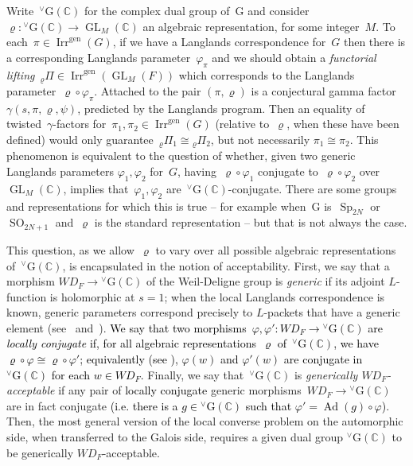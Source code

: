 \documentclass[12pt]{amsart}
\newcommand{\BC}{\mathbb {C}}
\newcommand{\Ad}{\operatorname{Ad}}
\newcommand{\GL}{\operatorname{GL}}
\newcommand{\Irr}{\operatorname{Irr}}
\newcommand{\Irrgen}{\Irr^{\operatorname{gen}}}
\newcommand{\SO}{\operatorname{SO}}
\newcommand{\G}{\mathrm{G}}
\newcommand{\Sp}{\operatorname{Sp}}
\newcommand{\WD}{{WD}}
\def\vG{{}^\vee\G}
\def\shaun#1{\textcolor{black}{#1}}
\begin{document}
Write~$\vG(\BC)$ for the complex dual group of~$\G$ and consider~$\varrho:\vG(\BC) \to \GL_M(\BC)$ an algebraic representation, for some integer~$M$. To each~$\pi\in\Irrgen(G)$, if we have a Langlands correspondence for~$G$ then there is a corresponding Langlands parameter~$\varphi_\pi$ and we should obtain a \emph{functorial lifting}~${}_\varrho\Pi\in\Irrgen(\GL_M(F))$ which corresponds to the Langlands parameter~$\varrho\circ\varphi_\pi$. Attached to the pair $(\pi, \varrho)$ is a conjectural gamma factor $\gamma(s, \pi, \varrho, \psi)$, predicted by the Langlands program.  Then an equality of twisted~$\gamma$-factors  for~$\pi_1,\pi_2\in\Irrgen(G)$ (relative to~$\varrho$, when these have been defined) would only guarantee~${}_\varrho\Pi_1 \cong {}_\varrho\Pi_2$, but not necessarily $\pi_1 \cong \pi_2$. This phenomenon is equivalent to the question of whether, given two generic Langlands parameters $\varphi_1,\varphi_2$ for~$G$, having~$\varrho\circ\varphi_1$ conjugate to~$\varrho\circ\varphi_2$ over~$\GL_M(\BC)$, implies that~$\varphi_1,\varphi_2$ are~$\vG(\BC)$-conjugate. There are some groups and representations for which this is true -- for example when~$\G$ is~$\Sp_{2N}$ or~$\SO_{2N+1}$ and~$\varrho$ is the standard representation -- but that is not always the case.

This question, as we allow~$\varrho$ to vary over all possible algebraic representations of~$\vG(\BC)$, is encapsulated in the notion of acceptability. First, we say that a morphism $\WD_F \rightarrow \vG(\BC)$ of the Weil-Deligne group is \emph{generic} if its adjoint $L$-function is holomorphic at $s = 1$; when the local Langlands correspondence is known, generic parameters correspond precisely to $L$-packets that have a generic element (see~\cite[\S2.2]{M24} and~\cite[Proposition~B.1]{GI16}).  \shaun{We say that two morphisms~$\varphi,\varphi':\WD_F\to\vG(\BC)$ are \emph{locally conjugate} if, for all algebraic representations~$\varrho$ of~$\vG(\BC)$, we have~$\varrho\circ\varphi\cong\varrho\circ\varphi'$; equivalently (see \cite{CG23}), 
$\varphi(w)$ and $\varphi'(w)$ are conjugate in $\vG(\BC)$ for each $w\in\WD_F$.}  Finally, we say that~$\vG(\BC)$ is %
\emph{generically $\WD_F$-acceptable}
  if any pair of \shaun{locally conjugate} %
 generic morphisms~$\WD_F\to\vG(\BC)$ are in fact conjugate \shaun{(i.e. there is a $g \in \vG(\BC)$ such that $\varphi' = \Ad(g)\circ \varphi$)}.  Then, the most general version of the local converse problem on the automorphic side, when transferred to the Galois side, requires %
 a given dual group $\vG(\BC)$ to be %
 generically $\WD_F$-acceptable.
\end{document}
